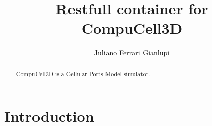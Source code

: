 
\title{Restfull container for CompuCell3D}

\author{Juliano Ferrari Gianlupi}


\renewcommand{\shortauthors}{J. F. Gianlupi}


\begin{abstract}

CompuCell3D is a Cellular Potts Model simulator. 

 
\end{abstract}



\maketitle

\section{Introduction}\label{hid-sp18-601-project-section-introduction}
 
\section{}\label{}

\subsection{}\label{}




 

